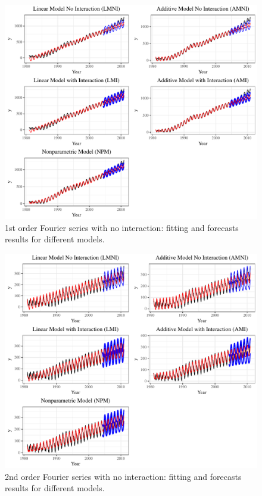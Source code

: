 \documentclass{article}\usepackage[]{graphicx}\usepackage[]{color}
\begin{document}
\begin{figure}[bp!]
\centering
\includegraphics[scale=0.7]{1st_order_no_inter.pdf}
\caption{1st order Fourier series with no interaction: fitting and forecasts results for different models.}
\label{fig:1st Fourier no inter}
\end{figure}


\begin{figure}[bp!]
\centering
\includegraphics[scale=0.7]{2nd_order_no_inter.pdf}
\caption{2nd order Fourier series with no interaction: fitting and forecasts results for different models.}
\label{fig:2nd Fourier no inter}
\end{figure}
\end{document}
